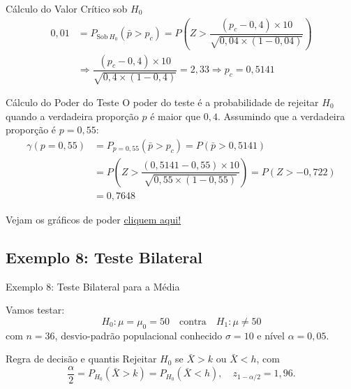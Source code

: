 \documentclass[12pt]{beamer}
\begin{document}
\begin{frame}{}
	\begin{block}{Cálculo do Valor Crítico sob $H_{0}$}
		\justifying
		\begin{align*}
			0,01&=P_{\text{Sob}~H_{0}}(\bar{p}>p_{c})=P(Z>\dfrac{(p_{c}-0,4)\times10}{\sqrt{0,04\times(1-0,04)}})\\
			&\Rightarrow \dfrac{(p_{c}-0,4)\times10}{\sqrt{0,4\times(1-0,4)}}=2,33\Rightarrow p_{c}=0,5141
		\end{align*}
	\end{block}
	\pause
	\begin{block}{Cálculo do Poder do Teste}
		\justifying
		O poder do teste é a probabilidade de rejeitar $H_0$ quando a verdadeira proporção $p$ é maior que $0,4$. Assumindo que a verdadeira proporção é $p=0,55:$
		\begin{align*}
			\gamma(p=0,55)&=P_{p=0,55}(\bar{p}>p_{c})=P(\bar{p}>0,5141)\\
			&=P(Z>\dfrac{(0,5141-0,55)\times10}{\sqrt{0,55\times(1-0,55)}})=P(Z>-0,722)\\
			&=0,7648
		\end{align*}
	\end{block}
\end{frame}

\begin{frame}{}
	\begin{block}{}
		Vejam os gráficos de poder \href{https://est711.shinyapps.io/FuncaoPoder/}{cliquem aqui!}
	\end{block}
\end{frame}

\subsection{Exemplo 8: Teste Bilateral}
\begin{frame}{Exemplo 8: Teste Bilateral para a Média}
	\begin{block}{}
		\justifying
		Vamos testar:
		\[
		H_0: \mu = \mu_0 = 50 \quad \text{contra} \quad H_1: \mu \neq 50
		\]
		com $n=36$, desvio-padrão populacional conhecido $\sigma=10$ e nível $\alpha=0{,}05$.
	\end{block}
	\pause
	\begin{block}{Regra de decisão e quantis}
		\justifying
		Rejeitar $H_0$ se $\bar X>k$ ou $\bar X<h$, com
		\[
		\frac{\alpha}{2} = P_{H_0}(\bar X>k) = P_{H_0}(\bar X<h),\quad
		z_{1-\alpha/2} = 1{,}96.
		\]
	\end{block}
\end{frame}
\end{document}
